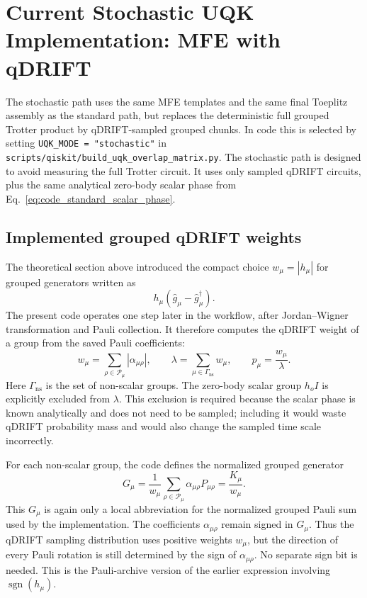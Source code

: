 \documentclass[11pt]{article}
\begin{document}
\section{Current Stochastic UQK Implementation: MFE with qDRIFT}

The stochastic path uses the same MFE templates and the same final Toeplitz assembly as the standard path, but replaces the deterministic full grouped Trotter product by qDRIFT-sampled grouped chunks.  In code this is selected by setting \texttt{UQK\_MODE = "stochastic"} in \texttt{scripts/qiskit/build\_uqk\_overlap\_matrix.py}.  The stochastic path is designed to avoid measuring the full Trotter circuit.  It uses only sampled qDRIFT circuits, plus the same analytical zero-body scalar phase from Eq.~\eqref{eq:code_standard_scalar_phase}.

\subsection{Implemented grouped qDRIFT weights}

The theoretical section above introduced the compact choice $w_\mu=|h_\mu|$ for grouped generators written as
\begin{equation}
    h_\mu\left(\hat{g}_\mu-\hat{g}_\mu^\dagger\right).
\end{equation}
The present code operates one step later in the workflow, after Jordan--Wigner transformation and Pauli collection.  It therefore computes the qDRIFT weight of a group from the saved Pauli coefficients:
\begin{equation}
    w_\mu
    =
    \sum_{\rho\in\mathcal{P}_\mu}
    |\alpha_{\mu\rho}|,
    \qquad
    \lambda
    =
    \sum_{\mu\in\Gamma_{\mathrm{ns}}}w_\mu,
    \qquad
    p_\mu=\frac{w_\mu}{\lambda}.
    \label{eq:code_qdrift_weights}
\end{equation}
Here $\Gamma_{\mathrm{ns}}$ is the set of non-scalar groups.  The zero-body scalar group $h_o I$ is explicitly excluded from $\lambda$.  This exclusion is required because the scalar phase is known analytically and does not need to be sampled; including it would waste qDRIFT probability mass and would also change the sampled time scale incorrectly.

For each non-scalar group, the code defines the normalized grouped generator
\begin{equation}
    G_\mu
    =
    \frac{1}{w_\mu}
    \sum_{\rho\in\mathcal{P}_\mu}
    \alpha_{\mu\rho}P_{\mu\rho}
    =
    \frac{K_\mu}{w_\mu}.
    \label{eq:code_qdrift_normalized_generator}
\end{equation}
This $G_\mu$ is again only a local abbreviation for the normalized grouped Pauli sum used by the implementation.  The coefficients $\alpha_{\mu\rho}$ remain signed in $G_\mu$.  Thus the qDRIFT sampling distribution uses positive weights $w_\mu$, but the direction of every Pauli rotation is still determined by the sign of $\alpha_{\mu\rho}$.  No separate sign bit is needed.  This is the Pauli-archive version of the earlier expression involving $\operatorname{sgn}(h_\mu)$.
\end{document}
